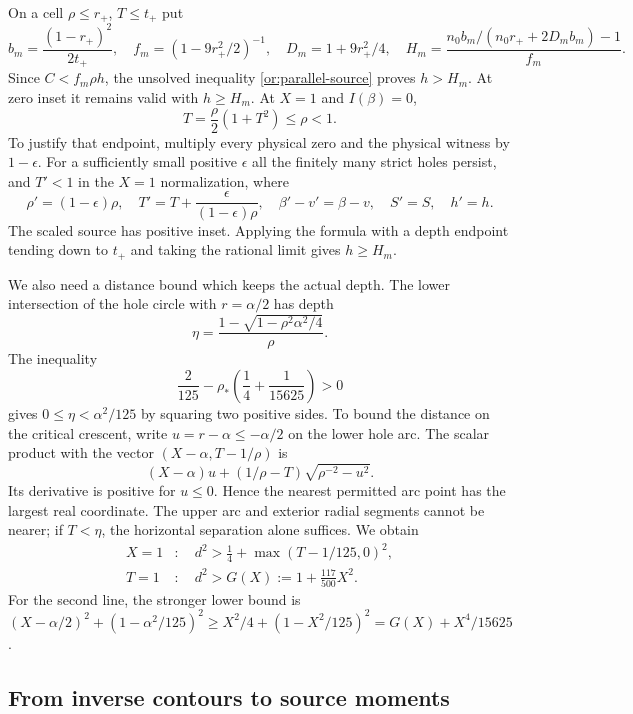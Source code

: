 \documentclass[11pt,reqno]{amsart}
\numberwithin{equation}{section}
\theoremstyle{definition}
\theoremstyle{remark}
\begin{document}
On a cell $\rho\le r_+$, $T\le t_+$ put
\begin{equation}\label{or:moving-field}
 b_m=\frac{(1-r_+)^2}{2t_+},\quad
 f_m=(1-9r_+^2/2)^{-1},\quad D_m=1+9r_+^2/4,\quad
 H_m=\frac{n_0b_m/(n_0r_++2D_mb_m)-1}{f_m}.
\end{equation}
Since $C<f_m\rho h$, the unsolved inequality
\eqref{or:parallel-source} proves $h>H_m$.  At zero inset it remains
valid with $h\ge H_m$.
At $X=1$ and $I(\beta)=0$,
\[
             T=\frac\rho2(1+T^2)\le\rho<1.
\]
To justify that endpoint, multiply every physical zero and the physical
witness by $1-\epsilon$.  For a sufficiently small positive $\epsilon$
all the finitely many strict holes persist, and $T'<1$ in the
$X=1$ normalization, where
\begin{equation}\label{or:homothety}
 \rho'=(1-\epsilon)\rho,\quad
 T'=T+\frac{\epsilon}{(1-\epsilon)\rho},\quad
 \beta'-v'=\beta-v,\quad S'=S,\quad h'=h.
\end{equation}
The scaled source has positive inset.  Applying the formula with a
depth endpoint tending down to $t_+$ and taking the rational limit
gives $h\ge H_m$.

We also need a distance bound which keeps the actual depth.  The lower
intersection of the hole circle with $r=\alpha/2$ has depth
\[
             \eta=\frac{1-\sqrt{1-\rho^2\alpha^2/4}}{\rho}.
\]
The inequality
\begin{equation}\label{or:height-gate}
 \frac2{125}-\rho_*\left(\frac14+\frac1{15625}\right)>0
\end{equation}
gives $0\le\eta<\alpha^2/125$ by squaring two positive sides.
To bound the distance on the critical crescent, write
$u=r-\alpha\le-\alpha/2$ on the lower hole arc.  The scalar
product with the vector $(X-\alpha,T-1/\rho)$ is
\[
 (X-\alpha)u+(1/\rho-T)\sqrt{\rho^{-2}-u^2}.
\]
Its derivative is positive for $u\le0$.  Hence the nearest permitted
arc point has the largest real coordinate.  The upper arc and exterior
radial segments cannot be nearer; if $T<\eta$, the horizontal
separation alone suffices.  We obtain
\begin{align}
 X=1&:\quad d^2>\frac14+\max(T-1/125,0)^2,\label{or:gap-X}\\
 T=1&:\quad d^2>G(X):=1+\frac{117}{500}X^2.\label{or:gap-T}
\end{align}
For the second line, the stronger lower bound is
$(X-\alpha/2)^2+(1-\alpha^2/125)^2
 \ge X^2/4+(1-X^2/125)^2
 =G(X)+X^4/15625$.

\subsection{From inverse contours to source moments}
\end{document}
